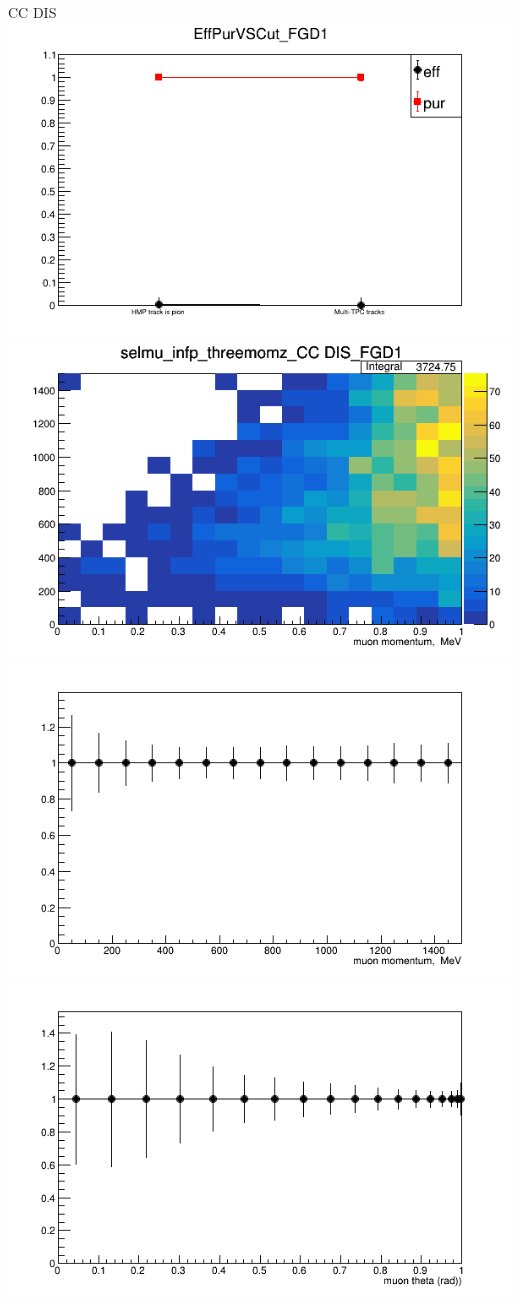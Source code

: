 \documentclass{beamer}
\begin{document}
\begin{frame}{CC DIS}
\center
\includegraphics[width=.45\textwidth]{images/CC DIS6_eff_pur_cut.png}
\includegraphics[width=.45\textwidth]{images/2D_selmu_mom:selmu_costheta_fgd2topology_CC DIS_accum_level[][0][64]_data_mc.png}
\includegraphics[width=.45\textwidth]{images/ratio_selmu_mom_topology_CC DIS_accum_level[][0][64]_data_mc.png}
\includegraphics[width=.45\textwidth]{images/ratio_selmu_costheta_topology_CC DIS_accum_level[][0][64]_data_mc.png}
\end{frame}
\end{document}
